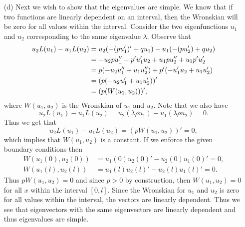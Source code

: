 \documentclass[12pt]{report}
\begin{document}
\begin{solution}
\begin{enumerate}
        \item [(d)]
        Next we wish to show that the eigenvalues are simple. We know that if two functions are linearly dependent on an interval, then the Wronskian will be zero for all values within the interval. Consider the two eigenfunctions $u_1$ and $u_2$ corresponding to the same eigenvalue $\lambda$. Observe that 
        \begin{align*}
            u_2L(u_1) - u_1L(u_2) &= u_2(-(pu_1')' + qu_1) - u_1(-(pu_2') + qu_2)\\
            &= -u_2pu_1'' - p'u_1'u_2 + u_1pu_2'' + u_1p'u_2'\\
            &= p{\left(-u_2u_1'' + u_1u_2''\right)} + p'{\left(-u_1'u_2 + u_1u_2'\right)}\\
            &=(p{\left(-u_2u_1' + u_1u_2'\right)})'\\
            &=(p(W(u_1,u_2)))',
        \end{align*}
        where $W(u_1,u_2)$ is the Wronskian of $u_1$ and $u_2$. Note that we also have 
        \[
            u_2L(u_1) - u_1L(u_2) = u_2(\lambda \rho u_1) - u_1(\lambda \rho u_2) = 0.
        \]
        Thus we get that
        \[ 
            u_2L(u_1) - u_1L(u_2) = (pW(u_1,u_2))' = 0,
        \]
        which implies that $W(u_1,u_2)$ is a constant. If we enforce the given boundary conditions then 
        \begin{align*}
            W(u_1(0),u_2(0)) &= u_1(0)u_2(0)' - u_2(0)u_1(0)' = 0,\\
            W(u_1(l),u_2(l)) &= u_1(l)u_2(l)' - u_2(l)u_1(l)' = 0.
        \end{align*}
        Thus $pW(u_1,u_2) = 0$ and since $p>0$ by construction, then $W(u_1,u_2) = 0$ for all $x$ within the interval $[0,l]$. Since the Wronskian for $u_1$ and $u_2$ is zero for all values within the interval, the vectors are linearly dependent. Thus we see that eigenvectors with the same eigenvectors are linearly dependent and thus eigenvalues are simple. 

    \end{enumerate}
\end{solution}

\newpage
\end{document}

